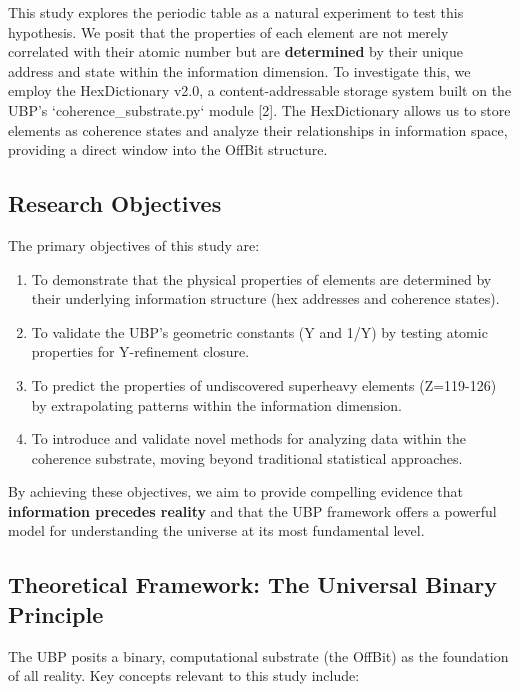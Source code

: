 \documentclass[12pt, a4paper]{article}
\begin{document}
This study explores the periodic table as a natural experiment to test this hypothesis. We posit that the properties of each element are not merely correlated with their atomic number but are \textbf{determined} by their unique address and state within the information dimension. To investigate this, we employ the HexDictionary v2.0, a content-addressable storage system built on the UBP's `coherence\_substrate.py` module [2]. The HexDictionary allows us to store elements as coherence states and analyze their relationships in information space, providing a direct window into the OffBit structure.

\subsection{Research Objectives}

The primary objectives of this study are:
\begin{enumerate}
    \item To demonstrate that the physical properties of elements are determined by their underlying information structure (hex addresses and coherence states).
    \item To validate the UBP's geometric constants (Y and 1/Y) by testing atomic properties for Y-refinement closure.
    \item To predict the properties of undiscovered superheavy elements (Z=119-126) by extrapolating patterns within the information dimension.
    \item To introduce and validate novel methods for analyzing data within the coherence substrate, moving beyond traditional statistical approaches.
\end{enumerate}

By achieving these objectives, we aim to provide compelling evidence that \textbf{information precedes reality} and that the UBP framework offers a powerful model for understanding the universe at its most fundamental level.

\subsection{Theoretical Framework: The Universal Binary Principle}

The UBP posits a binary, computational substrate (the OffBit) as the foundation of all reality. Key concepts relevant to this study include:
\end{document}
